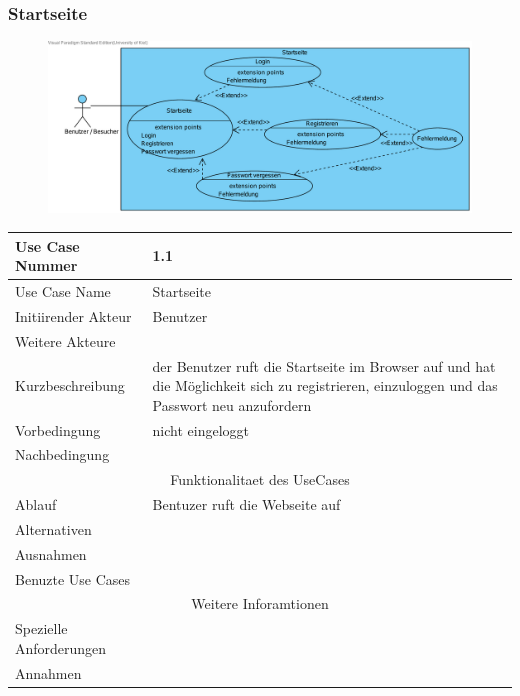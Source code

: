 \documentclass[10pt,a4paper]{article}
\begin{document}
	\subsubsection{Startseite}
	\begin{figure}[h]
		\includegraphics[width=\linewidth,]{gfx/webseite/startseite.pdf}
	\end{figure}
	\begin{tabular}{|l|p{.5\linewidth}|}
	\hline Use Case Nummer & 1.1 \\ 
	\hline Use Case Name & Startseite \\ 
	\hline Initiirender Akteur & Benutzer \\
	\hline Weitere Akteure &  \\
	\hline Kurzbeschreibung & der Benutzer ruft die Startseite im Browser auf und hat die M\"oglichkeit sich zu registrieren, einzuloggen und das Passwort neu anzufordern \\
	\hline Vorbedingung & nicht eingeloggt \\
	\hline Nachbedingung &  \\
	\hline \multicolumn{2}{|c|}{Funktionalitaet des UseCases}\\
	\hline Ablauf & Bentuzer ruft die Webseite auf \\
	\hline Alternativen &  \\
	\hline Ausnahmen &  \\
	\hline Benuzte Use Cases &  \\
	\hline \multicolumn{2}{|c|}{Weitere Inforamtionen} \\
	\hline Spezielle Anforderungen &  \\
	\hline Annahmen &  \\
	\hline
	\end{tabular} 
\end{document}
